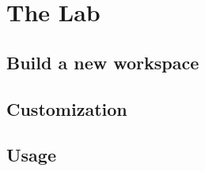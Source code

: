\section{The Lab}


\subsection{Build a new workspace} %





\subsection{Customization} %





\subsection{Usage} %





